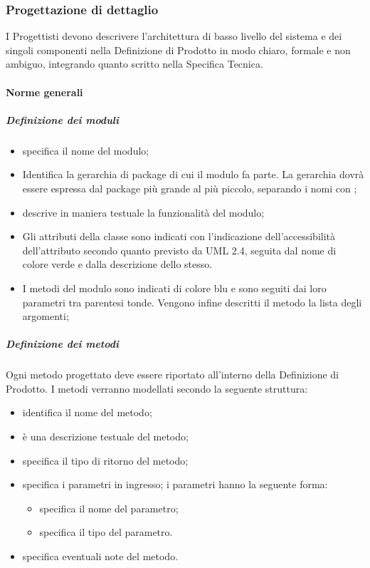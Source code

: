 \subsubsection{Progettazione di dettaglio}
\label{prog_dettaglio}
I Progettisti devono descrivere l'architettura di basso livello del sistema e dei singoli componenti nella Definizione di Prodotto in modo chiaro, formale e non ambiguo, integrando quanto scritto nella Specifica Tecnica.


\paragraph{Norme generali}

\subparagraph{Definizione dei moduli}
\label{}

\begin{itemize}
\item {}specifica il nome del modulo;
\item {} Identifica la gerarchia di package di cui il modulo fa parte. La gerarchia dovrà essere espressa dal package più grande al più piccolo, separando i nomi con \og  \fg{::};
\item {}descrive in maniera testuale la funzionalità del modulo;
\item {}Gli attributi della classe sono indicati con l’indicazione dell’accessibilità dell’attributo secondo quanto previsto da UML 2.4, seguita dal nome di colore verde e dalla descrizione dello stesso.
\item {}I metodi del modulo sono indicati di colore blu e sono seguiti dai loro parametri tra parentesi tonde.
Vengono infine descritti il metodo  la lista degli argomenti;
\end{itemize}

\subparagraph{Definizione dei metodi}
Ogni metodo progettato deve essere riportato all'interno della Definizione di Prodotto. I metodi verranno modellati secondo la seguente struttura:
\begin{itemize}
\item {}identifica il nome del metodo;
\item {}è una descrizione testuale del metodo;
\item {}specifica il tipo di ritorno del metodo;
\item {}specifica i parametri in ingresso; i parametri hanno la seguente forma:
\begin{itemize}
\item {}specifica il nome del parametro;
\item {}specifica il tipo del parametro.
\end{itemize}
\item {}specifica eventuali note del metodo.
\end{itemize}


